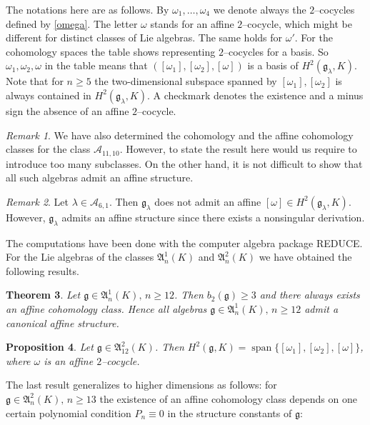 \documentclass[12pt]{amsart}
\newtheorem{thm}{Theorem}[section]
\newtheorem{prop}[thm]{Proposition}
\theoremstyle{definition}
\theoremstyle{remark}
\newtheorem{rem}[thm]{Remark}
\DeclareMathOperator{\s}{span}
\newcommand{\Lg}{\mathfrak{g}}
\newcommand{\LA}{\mathfrak{A}}
\newcommand{\CA}{\mathcal{A}}
\newcommand{\la}{\lambda}
\newcommand{\om}{\omega}
\begin{document}
\vspace{0.3cm}
The notations here are as follows. By $\om_1,\ldots,\om_4$ we denote always
the $2$--cocycles defined by \eqref{omega}. The letter $\om$ stands for an 
affine $2$--cocycle,
which might be different for distinct classes of Lie algebras.
The same holds for $\om'$. For the cohomology spaces the table shows representing
$2$--cocycles for a basis. So $\om_1,\om_2,\om$ in the table means that
$([\om_1],[\om_2],[\om])$ is a basis of $H^2(\Lg_{\la},K)$.
Note that for $n\ge 5$ the two-dimensional subspace spanned by
$[\om_1],[\om_2]$ is always contained in $H^2(\Lg_{\la},K)$.
A checkmark denotes the existence and a minus sign the absence of an
affine $2$--cocycle. 

\begin{rem}
We have also determined the
cohomology and the affine cohomology classes for the
class $\CA_{11,10}$. 
However, to state the result here would us require to introduce too 
many subclasses. 
On the other hand, it is not difficult to show that
all such algebras admit an affine structure. 
\end{rem}

\begin{rem}
Let $\la\in \CA_{6,1}$. Then $\Lg_{\la}$ does not admit an affine
$[\om]\in H^2(\Lg_{\la},K)$. However, $\Lg_{\la}$ admits an affine
structure since there exists a nonsingular derivation.
\end{rem} 

The computations have been done with the computer algebra
package REDUCE. For the Lie algebras of the classes 
$\LA_n^1(K)$ and $\LA_n^2(K)$ we have obtained the following results.

\begin{thm}
Let $\Lg \in \LA_n^1(K),\, n\ge 12$. Then $b_2(\Lg)\ge 3$ and
there always exists an affine cohomology class. Hence all algebras
$\Lg \in \LA_n^1(K),\, n\ge 12$ admit a canonical affine structure.
\end{thm}

\begin{prop}
Let $\Lg\in \LA^2_{12}(K)$. Then $H^2(\Lg,K)=\s \{[\om_1],[\om_2],[\om]\}$,
where $\om$ is an affine $2$--cocycle.
\end{prop}

The last result generalizes to higher dimensions as follows: 
for $\Lg\in \LA^2_{n}(K),\, n\ge 13$ the existence of an affine
cohomology class depends on one certain polynomial condition $P_n\equiv 0$
in the structure constants of $\Lg$:
\end{document}
